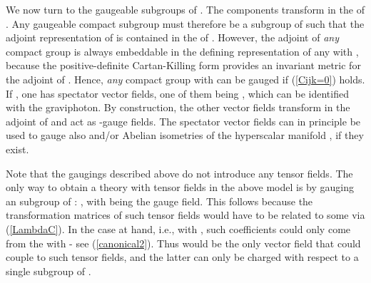 \documentclass[a4paper,11pt]{article}
\providecommand{\M}{\ensuremath{\mathcal{M}}}
\begin{document}
We now turn to the gaugeable subgroups of \coordHE{}. The
components \coordHE{} transform in the \coordHE{} of \coordHE{}. Any gaugeable
compact subgroup \coordHE{} must therefore be a subgroup of \coordHE{}
such that the adjoint representation of \coordHE{} is contained in the
\coordHE{} of \coordHE{}. However, the adjoint of \emph{any} compact group
\coordHE{} is always embeddable in the defining representation of any \coordHE{}
with \coordHE{}, because the positive-definite Cartan-Killing form
\coordHE{} provides an invariant metric for the adjoint of \coordHE{}. Hence,
\emph{any} compact group \coordHE{} with \coordHE{} can be gauged if
(\ref{Cijk=0})  holds. If \coordHE{}, one has \coordHE{} spectator
vector fields, one of them being \coordHE{}, which can be identified
with the graviphoton. By construction, the other \coordHE{} vector fields
transform in the adjoint of \coordHE{} and act as \coordHE{}-gauge fields. The spectator
vector fields can in principle be used to gauge also \coordHE{} and/or
Abelian isometries of the hyperscalar manifold \myHighlight{$\M_{Q}$}\coordHE{}, if they exist. 



Note that the gaugings described above do not introduce any tensor fields.
The only way to obtain a theory with tensor fields in the above model is
by gauging an \coordHE{} subgroup of \coordHE{}: \coordHE{}, with \coordHE{}
being the \coordHE{} gauge field.  This follows because the transformation
matrices \coordHE{} of such tensor fields would have to be related
to some \coordHE{} via (\ref{LambdaC}). In the case at hand, i.e., with
\coordHE{}, such coefficients could only come from the \coordHE{} with
\coordHE{} - see (\ref{canonical2}). Thus \coordHE{} would be the only vector
field that could couple to such tensor fields, and the latter can only be
charged with respect to a single \coordHE{} subgroup of \coordHE{}. 
\end{document}

